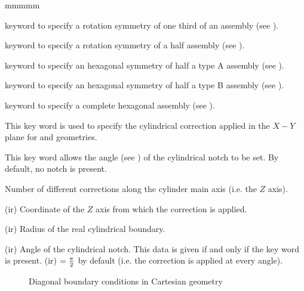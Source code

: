\begin{ListeDeDescription}{mmmmm}
\item[\moc{R120}] keyword to specify a rotation symmetry of one third of an
assembly (see ).

\item[\moc{R180}] keyword to specify a rotation symmetry of a half assembly
(see ).

\item[\moc{SA180}] keyword to specify an hexagonal symmetry of half a type A
assembly (see ).

\item[\moc{SB180}] keyword to specify an hexagonal symmetry of half a type B
assembly (see ).

\item[\moc{COMPLETE}] keyword to specify a complete hexagonal assembly (see
).

\item[\moc{RADS}] This key word is used to specify the cylindrical correction applied in the $X-Y$ plane for  and  geometries.\cite{roy}

\item[\moc{ANG}] This key word allows  the angle (see )
of the cylindrical notch to be set. By default, no notch is present.

\item[\dusa{nrads}] Number of different corrections along the cylinder main axis (i.e. the $Z$ axis).

\item[\dusa{xrad}(ir)] Coordinate of the $Z$ axis from which the correction is applied.

\item[\dusa{rrad}(ir)] Radius of the real cylindrical boundary.

\item[\dusa{ang}(ir)] Angle of the cylindrical notch. This data is given if and only if the key word  is present. (ir) $= {\pi \over 2}$ by default (i.e. the correction is applied at every angle).

\end{ListeDeDescription}
\goodbreak

\begin{figure}[!]  
\begin{center} 
\epsfxsize=13cm
\centerline{ }
\parbox{14cm}{\caption{Diagonal boundary conditions in Cartesian geometry}\label{fig:cartebc}}   
\end{center}  
\end{figure}

